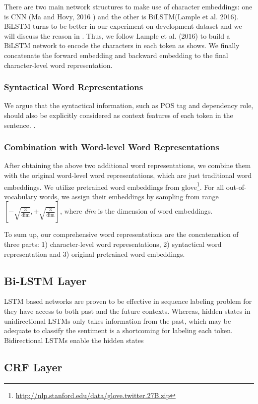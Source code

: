 There are two main network structures to make use of character embeddings: 
one is CNN (Ma and Hovy, 2016 \cite{} ) and the other is BiLSTM(Lample et al. 2016).
BiLSTM turns to be better in our experiment on development dataset and we will discuss the reason in .
Thus, we follow Lample et al. (2016) to build a BiLSTM network to encode the characters in each token as  shows. 
We finally concatenate the forward embedding and backward embedding to the final character-level word representation.



\subsubsection{Syntactical Word Representations}
We argue that the syntactical information, such as POS tag and dependency role, should also be explicitly considered as context features of each token in the sentence. 
.
 
\subsubsection{Combination with Word-level Word Representations}
After obtaining the above two additional word representations, we combine them with the original word-level word representations, which are just traditional word embeddings. 
We utilize pretrained word embeddings from glove\footnote{\url{http://nlp.stanford.edu/data/glove.twitter.27B.zip}}.
For all out-of-vocabulary words, we assign their embeddings by sampling from range $\left[-\sqrt{\frac{3}{\text{dim}}}, +\sqrt{\frac{3}{\text{dim}}}\right]$, where \textit{dim} is the dimension of word embeddings.

To sum up, our comprehensive word representations are the concatenation of three parts: 1) character-level word representations, 2) syntactical word representation and 3)  original pretrained word embeddings.

\subsection{Bi-LSTM Layer}
LSTM based networks are proven to be effective in sequence labeling problem for they have access to both past and the future contexts. 
Whereas, hidden states in unidirectional LSTMs only takes information from the past, which may be adequate to classify the sentiment  is a shortcoming for labeling each token.
Bidirectional LSTMs enable the hidden states 
\subsection{CRF Layer}

